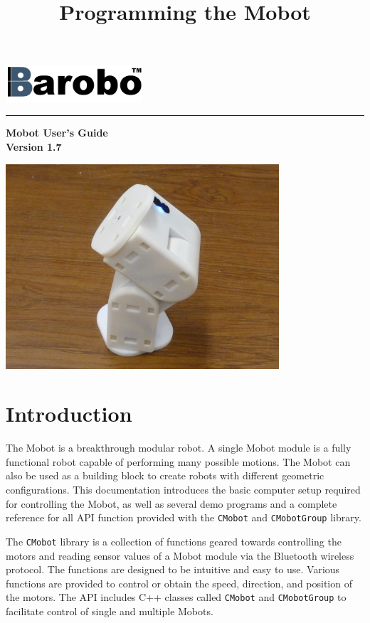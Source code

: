 \documentclass{article}
\title{Programming the Mobot}
\begin{document}
\includegraphics[width=2in]{images/Barobo.png}
\hrule
\begin{center}
\vspace*{2.5cm}
{\Huge\sf\bf Mobot User's Guide}\\
\vspace*{2.5cm}
{\Large\bf Version 1.7}
\vspace{4.5cm}

\includegraphics[width=4in]{images/Mobot_Camera_Stand.JPG}
\end{center}


\newpage
\tableofcontents
\newpage
\section{Introduction}
The Mobot is a breakthrough modular robot. A single Mobot module is a fully 
functional robot capable of performing many possible motions. The Mobot
can also be used as a building block to create robots with different
geometric configurations. 
This documentation introduces the basic computer setup required for controlling 
the Mobot, as well as several demo programs and a complete reference for all
API function provided with the \texttt{CMobot} and \texttt{CMobotGroup} library.

The \texttt{CMobot} library is a collection of functions geared towards
controlling the motors and reading sensor values of a Mobot module via the
Bluetooth wireless protocol. The functions are designed to be intuitive
and easy to use. Various functions are provided to control or obtain the speed,
direction, and position of the motors. The API includes C++ classes called
\texttt{CMobot} and \texttt{CMobotGroup} to facilitate control of 
single and multiple Mobots.
\end{document}
